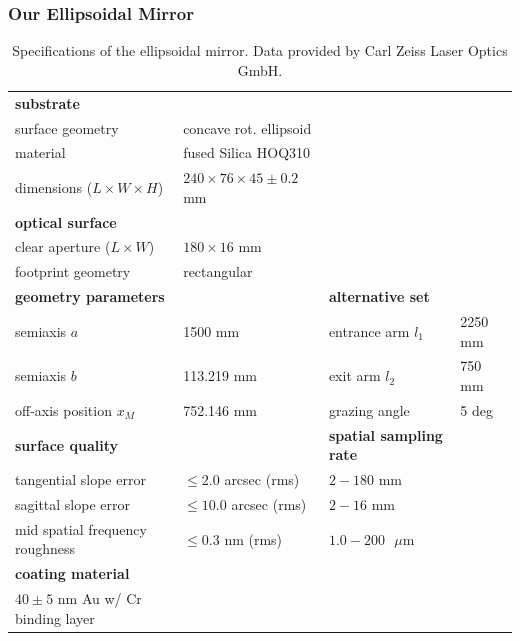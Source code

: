 \subsubsection{Our Ellipsoidal Mirror}

\begin{table}[]
	\begin{tabular}{|llll|}
		\hline
		\textbf{substrate} &  &  &  \\
		surface geometry & concave rot. ellipsoid &  &  \\
		material & fused Silica HOQ310 &  &  \\
		dimensions ($L \times W \times H$) & $240 \times 76 \times 45 \pm 0.2$ mm &  &  \\ \hline
		\textbf{optical surface} &  &  &  \\
		clear aperture ($L \times W$) & $180 \times 16$ mm &  &  \\
		footprint geometry & rectangular &  &  \\ \hline
		\multicolumn{2}{|l|}{\textbf{geometry parameters}} & \multicolumn{2}{l|}{\textbf{alternative set}} \\
		semiaxis $a$ & \multicolumn{1}{l|}{1500 mm} & entrance arm $l_1$ & 2250 mm \\
		semiaxis $b$ & \multicolumn{1}{l|}{113.219 mm} & exit arm $l_2$ & 750 mm \\
		off-axis position $x_M$ & \multicolumn{1}{l|}{752.146 mm} & grazing angle & 5 deg \\ \hline
		\multicolumn{2}{|l|}{\textbf{surface quality}} & \textbf{spatial sampling rate} &  \\
		tangential slope error & \multicolumn{1}{l|}{$\le 2.0$ arcsec (rms)} & $2 - 180$ mm &  \\
		sagittal slope error & \multicolumn{1}{l|}{$\le 10.0$ arcsec (rms)} & $2 - 16$ mm &  \\
		mid spatial frequency roughness & \multicolumn{1}{l|}{$\le 0.3$ nm (rms)} & $1.0 - 200 \textrm{ } \mu$m &  \\ \hline
		\textbf{coating material} &  &  &  \\
		$40 \pm 5$ nm Au w/ Cr binding layer &  &  &  \\ \hline
	\end{tabular}
	\caption{Specifications of the ellipsoidal mirror. Data provided by Carl Zeiss Laser Optics GmbH.}
	\label{tab:EM_specs}
\end{table}

